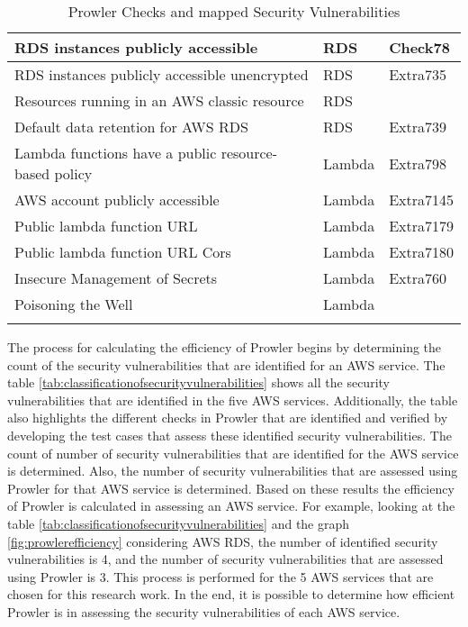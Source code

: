 \begin{longtable}{|p{10cm}|p{2.4cm}|p{2cm}|}
    \hline
    RDS instances publicly accessible & RDS & Check78\\
    \hline
    RDS instances publicly accessible unencrypted & RDS & Extra735\\
    \hline
    Resources running in an AWS classic resource & RDS & \\
    \hline
    Default data retention for AWS RDS & RDS & Extra739\\
    \hline
    Lambda functions have a public resource-based policy & Lambda & Extra798 \\
    \hline
    AWS account publicly accessible & Lambda & Extra7145 \\
    \hline
    Public lambda function URL & Lambda & Extra7179 \\
    \hline
    Public lambda function URL Cors & Lambda & Extra7180 \\
    \hline
    Insecure Management of Secrets & Lambda & Extra760\\
    \hline
    Poisoning the Well & Lambda & \\
    \hline
    \caption{Prowler Checks and mapped Security Vulnerabilities}
    \label{tab:securityvulnerabilitiescheckin prowler}
\end{longtable}

\par The process for calculating the efficiency of Prowler begins by determining the count of the security vulnerabilities that are identified for an AWS service.
The table \ref{tab:classificationofsecurityvulnerabilities} shows all the security vulnerabilities that are identified in the five AWS services.
Additionally, the table also highlights the different checks in Prowler that are identified and verified by developing the test cases that assess these identified security vulnerabilities.
The count of number of security vulnerabilities that are identified for the AWS service is determined.
Also, the number of security vulnerabilities that are assessed using Prowler for that AWS service is determined.
Based on these results the efficiency of Prowler is calculated in assessing an AWS service.
For example, looking at the table \ref{tab:classificationofsecurityvulnerabilities} and the graph \ref{fig:prowlerefficiency} considering AWS RDS, the number of identified security vulnerabilities is 4, and the number of security vulnerabilities that are assessed using Prowler is 3.
This process is performed for the 5 AWS services that are chosen for this research work.
In the end, it is possible to determine how efficient Prowler is in assessing the security vulnerabilities of each AWS service.


